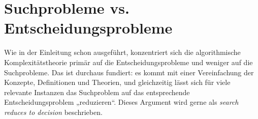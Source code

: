 

\section{Suchprobleme vs. Entscheidungsprobleme}\label{sec:search-vs-decision}

Wie in der Einleitung schon ausgeführt, konzentriert sich die algorithmische Komplexitätstheorie primär auf die Entscheidungsprobleme und weniger auf die Suchprobleme. Das ist durchaus fundiert: es kommt mit einer Vereinfachung der Konzepte, Definitionen und Theorien, und gleichzeitig lässt sich für viele relevante Instanzen das Suchproblem auf das entsprechende Entscheidungsproblem „reduzieren“. Dieses Argument wird gerne als \emph{search reduces to decision} beschrieben.


